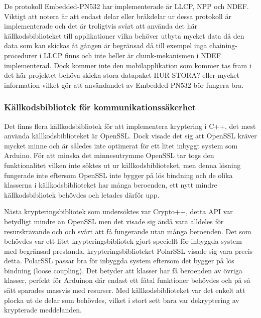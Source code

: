 \documentclass[11pt]{article}
\begin{document}
De protokoll Embedded-PN532 har implementerade är LLCP, NPP och NDEF. Viktigt att notera är att endast delar eller bråkdelar ur dessa protokoll är implementerade och det är troligtvis svårt att använda det här källkodsbiblioteket till applikationer vilka behöver utbyta mycket data då den data som kan skickas åt gången är begränsad då till exempel inga chaining-procedurer i LLCP finns och inte heller är chunk-mekanismen i NDEF implementerad. Dock kommer inte den mobilapplikation som kommer tas fram i det här projektet behöva skicka stora datapaket HUR STORA? eller mycket information vilket gör att användandet av Embedded-PN532 bör fungera bra.

\subsubsection{Källkodsbibliotek för kommunikationssäkerhet}
Det finns flera källkodsbibliotek för att implementera kryptering i C++,  det mest använda källkodsbiblioteket är OpenSSL. Dock visade det sig att OpenSSL kräver mycket minne och är således inte optimerat för ett litet inbyggt system som Arduino. För att minska det minnesutrymme OpenSSL tar togs den funktionalitet vilken inte söktes ut ur källkodsbiblioteket, men denna lösning fungerade inte eftersom OpenSSL inte bygger på lös bindning och de olika klasserna i källkodsbiblioteket har många beroenden, ett nytt mindre källkodsbibliotek behövdes och letades därför upp.

Nästa krypteringsbibliotek som undersöktes var Crypto++, detta API var betydligt mindre än OpenSSL men det visade sig ändå vara alldeles för resurskrävande och och svårt att få fungerande utan många beroenden. Det som behövdes var ett litet krypteringsbibliotek gjort speciellt för inbyggda system med begränsad prestanda, krypteringsbiblioteket PolarSSL visade sig vara precis detta. PolarSSL passar bra för inbyggda system eftersom det bygger på lös bindning (loose coupling). Det betyder att klasser har få beroenden av övriga klasser, perfekt för Arduinon där endast ett fåtal funktioner behövdes och på så sätt sparades massvis med resurser. Med källkodsbiblioteket var det enkelt att plocka ut de delar som behövdes, vilket i stort sett bara var dekryptering av krypterade meddelanden. 
\end{document}

